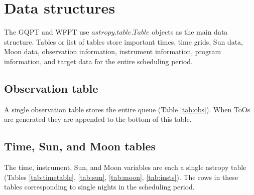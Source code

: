 \documentclass{article}
\begin{document}
\section{Data structures}

The GQPT and WFPT use $astropy.table.Table$ objects as the main data structure.  Tables or list of tables store important times, time grids, Sun data, Moon data, observation information, instrument information, program information, and target data for the entire scheduling period.

\begin{table}[h!]
\caption{Main data structures used in GQPT, WFPT}\label{tab:vars}
\centering
\centering
{}
\end{table}

\subsection{Observation table}

A single observation table stores the entire queue (Table \ref{tab:obs}).  When ToOs are generated they are appended to the bottom of this table. 

\subsection{Time, Sun, and Moon tables}

The time, instrument, Sun, and Moon variables are each a single astropy table (Tables \ref{tab:timetable}, \ref{tab:sun}, \ref{tab:moon}, \ref{tab:insts}).  The rows in these tables corresponding to single nights in the scheduling period. 
\end{document}
